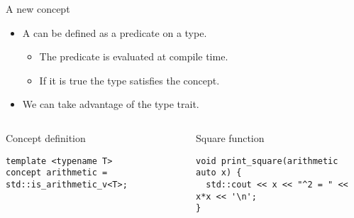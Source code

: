 \begin{frame}[t,fragile]{A new concept}
\begin{itemize}
  \item A  can be defined as a predicate on a type.
    \begin{itemize}
      \item The predicate is evaluated at compile time.
      \item If it is true the type satisfies the concept.
    \end{itemize}

  \item We can take advantage of the  type trait.
\end{itemize}

\begin{columns}[T]

\begin{block}{Concept definition}
\begin{lstlisting}
template <typename T>
concept arithmetic = std::is_arithmetic_v<T>;
\end{lstlisting}
\end{block}

\pause
{}
\begin{block}{Square function}
\begin{lstlisting}
void print_square(arithmetic auto x) {
  std::cout << x << "^2 = " << x*x << '\n';
}
\end{lstlisting}
\end{block}

\end{columns}
\end{frame}
